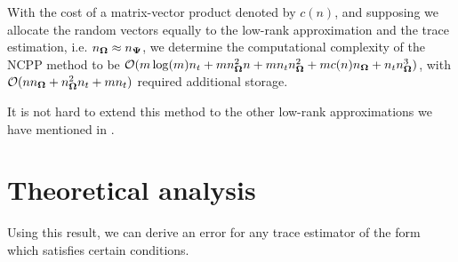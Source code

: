 With the cost of a matrix-vector product denoted by
$c(n)$, and supposing we allocate the random vectors equally
to the low-rank approximation and the trace estimation, i.e. $n_{\boldsymbol{\Omega}} \approx n_{\boldsymbol{\Psi}}$,
we determine the computational complexity of the \gls{NCPP}
method to be $\mathcal{O}(m \log(m) n_t + m n_{\boldsymbol{\Omega}}^2 n + m n_t n_{\boldsymbol{\Omega}}^2 +  m c(n) n_{\boldsymbol{\Omega}} + n_t n_{\boldsymbol{\Omega}}^3)$, with
$\mathcal{O}(n n_{\boldsymbol{\Omega}} + n_{\boldsymbol{\Omega}}^2 n_t + m n_t)$ required additional storage.\\


It is not hard to extend this method to the other low-rank approximations
we have mentioned in .


\section{Theoretical analysis}
\label{sec:4-nystromchebyshev-analysis}


Using this result, we can derive an error for any trace estimator of the form
 which satisfies certain conditions.

